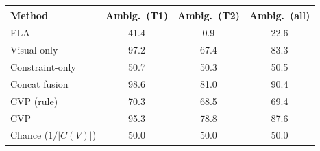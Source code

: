 \begin{tabular}{lccc}
\toprule
Method & Ambig.\ (T1) & Ambig.\ (T2) & Ambig.\ (all)\\
\midrule
ELA & 41.4 & 0.9 & 22.6\\
Visual-only & 97.2 & 67.4 & 83.3\\
Constraint-only & 50.7 & 50.3 & 50.5\\
Concat fusion & 98.6 & 81.0 & 90.4\\
CVP (rule) & 70.3 & 68.5 & 69.4\\
CVP & 95.3 & 78.8 & 87.6\\
\midrule
Chance ($1/|C(V)|$) & 50.0 & 50.0 & 50.0\\
\bottomrule
\end{tabular}
